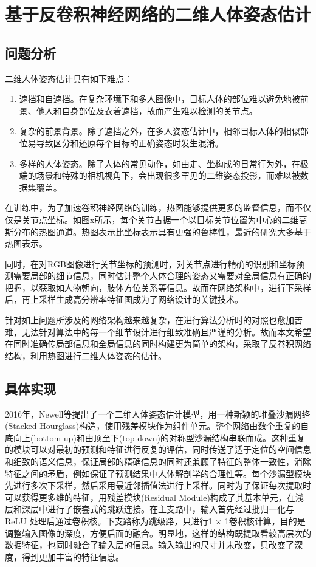 
\chapter{基于反卷积神经网络的二维人体姿态估计}


\section{问题分析}
\esection{}
二维人体姿态估计具有如下难点：

\begin{enumerate}
    \item 遮挡和自遮挡。在复杂环境下和多人图像中，目标人体的部位难以避免地被前景、他人和自身部位及衣着遮挡，故而产生难以检测的关节点。
    \item 复杂的前景背景。除了遮挡之外，在多人姿态估计中，相邻目标人体的相似部位易导致区分和还原每个目标的正确姿态时发生混淆。
    \item 多样的人体姿态。除了人体的常见动作，如由走、坐构成的日常行为外，在极端的场景和特殊的相机视角下，会出现很多罕见的二维姿态投影，而难以被数据集覆盖。
\end{enumerate}

在训练中，为了加速卷积神经网络的训练，热图能够提供更多的监督信息，而不仅仅是关节点坐标。如图x所示，每个关节占据一个以目标关节位置为中心的二维高斯分布的热图通道。热图表示比坐标表示具有更强的鲁棒性，最近的研究大多基于热图表示。

同时，在对RGB图像进行关节坐标的预测时，对关节点进行精确的识别和坐标预测需要局部的细节信息，同时估计整个人体合理的姿态又需要对全局信息有正确的把握，以获取如人物朝向，肢体方位关系等信息。故而在网络架构中，进行下采样后，再上采样生成高分辨率特征图成为了网络设计的关键技术。

针对如上问题所涉及的网络架构越来越复杂，在进行算法分析时的对照也愈加苦难，无法针对算法中的每一个细节设计进行细致准确且严谨的分析。故而本文希望在同时准确传局部信息和全局信息的同时构建更为简单的架构，采取了反卷积网络结构，利用热图进行二维人体姿态的估计。


\section{具体实现}

2016年，Newell等提出了一个二维人体姿态估计模型，用一种新颖的堆叠沙漏网络(Stacked Hourglass)构造，使用残差模块作为组件单元。整个网络由数个重复的自底向上(bottom-up)和由顶至下(top-down)的对称型沙漏结构串联而成。这种重复的模块可以对最初的预测和特征进行反复的评估，同时传送了适于定位的空间信息和细致的语义信息，保证局部的精确信息的同时还兼顾了特征的整体一致性，消除特征之间的矛盾，例如保证了预测结果中人体解剖学的合理性等。每个沙漏型模块先进行多次下采样，然后采用最近邻插值法进行上采样。同时为了保证每次提取时可以获得更多维的特征，用残差模块(Residual Module)构成了其基本单元，在浅层和深层中进行了嵌套式的跳跃连接。在主支路中，输入首先经过批归一化与 ReLU 处理后通过卷积核。下支路称为跳级路，只进行1 × 1卷积核计算，目的是调整输入图像的深度，方便后面的融合。明显地，这样的结构既提取看较高层次的数据特征，也同时融合了输入层的信息。输入输出的尺寸并未改变，只改变了深度，得到更加丰富的特征信息。

